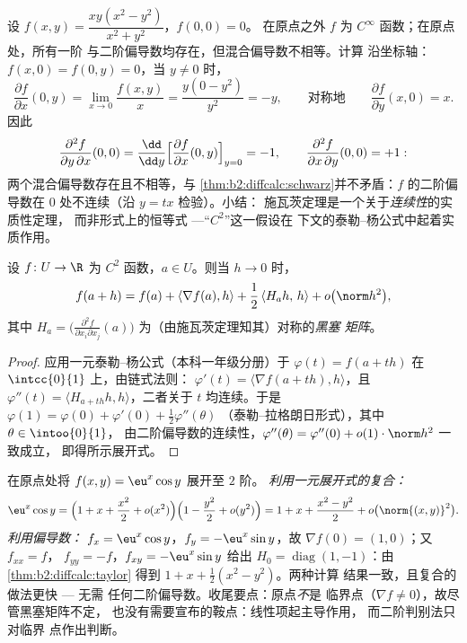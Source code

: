 \begin{example}\label{ex:b2:diffcalc:peano}
设 $f(x, y) = \dfrac{xy(x^2 - y^2)}{x^2 + y^2}$，$f(0,0) = 0$。
在原点之外 $f$ 为 $C^\infty$ 函数；在原点处，所有一阶
与二阶偏导数均存在，但混合偏导数不相等。计算
沿坐标轴：$f(x, 0) = f(0, y) = 0$，当 $y \neq 0$ 时，
\[
\frac{\partial f}{\partial x}(0, y)
= \lim_{x\to0}\frac{f(x,y)}{x}
= \frac{y(0 - y^2)}{y^2} = -y ,
\qquad\text{对称地}\qquad
\frac{\partial f}{\partial y}(x, 0) = x .
\]
因此
\[
\frac{\partial^2 f}{\partial y\,\partial x}(0,0)
= \frac{\dd}{\dd y}\Bigl[\frac{\partial f}{\partial
x}(0,y)\Bigr]_{y=0} = -1,
\qquad
\frac{\partial^2 f}{\partial x\,\partial y}(0,0) = +1 :
\]
两个混合偏导数存在且不相等，与
\cref{thm:b2:diffcalc:schwarz}并不矛盾：$f$ 的二阶偏导数在
$0$ 处不连续（沿 $y = tx$ 检验）。小结：
施瓦茨定理是一个关于\emph{连续性}的实质性定理，
而非形式上的恒等式 ---“$C^2$”这一假设在
下文的泰勒--杨公式中起着实质作用。
\end{example}

\begin{theorem}\label{thm:b2:diffcalc:taylor}
设 $f \colon U \to \R$ 为 $C^2$ 函数，$a \in U$。则当 $h \to 0$ 时，
\[
f(a + h) = f(a) + \langle\nabla f(a), h\rangle
+ \frac12\, \langle H_a h,\, h\rangle + o\bigl(\norm h^2\bigr),
\]
其中 $H_a = \bigl(\frac{\partial^2 f}{\partial x_i\partial
x_j}(a)\bigr)$ 为（由施瓦茨定理知其）对称的\emph{黑塞
矩阵}。
\end{theorem}

\begin{proof}
应用一元泰勒--杨公式（本科一年级分册）于
$\varphi(t) = f(a + th)$ 在 $\intcc{0}{1}$ 上，由链式法则：
$\varphi'(t) = \langle \nabla f(a + th), h\rangle$，且 $\varphi''(t)
= \langle H_{a+th}h, h\rangle$，二者关于 $t$ 均连续。于是
$\varphi(1) = \varphi(0) + \varphi'(0) + \frac12\varphi''(\theta)$
（泰勒--拉格朗日形式），其中 $\theta \in \intoo{0}{1}$，
由二阶偏导数的连续性，$\varphi''(\theta) =
\varphi''(0) + o(1)\cdot\norm h^2$ 一致成立，
即得所示展开式。
\end{proof}

\begin{example}[两种方式展开]\label{ex:b2:diffcalc:taylortwoways}
在原点处将 $f(x, y) = \eu^x\cos y$ 展开至 $2$ 阶。
\emph{利用一元展开式的复合：}
\[
\eu^x\cos y = \Bigl(1 + x + \frac{x^2}{2} +
o(x^2)\Bigr)\Bigl(1 - \frac{y^2}{2} + o(y^2)\Bigr)
= 1 + x + \frac{x^2 - y^2}{2} + o\bigl(\norm{(x,y)}^2\bigr) .
\]
\emph{利用偏导数：} $f_x = \eu^x\cos y$，$f_y =
-\eu^x\sin y$，故 $\nabla f(0) = (1, 0)$；又 $f_{xx} = f$，
$f_{yy} = -f$，$f_{xy} = -\eu^x\sin y$ 给出 $H_0 =
\operatorname{diag}(1, -1)$：由\cref{thm:b2:diffcalc:taylor}
得到 $1 + x + \frac12(x^2 - y^2)$。两种计算
结果一致，且复合的做法更快 --- 无需
任何二阶偏导数。收尾要点：原点\emph{不}是
临界点（$\nabla f \neq 0$），故尽管黑塞矩阵不定，
也没有需要宣布的鞍点：线性项起主导作用，
而二阶判别法只对临界
点作出判断。
\end{example}

